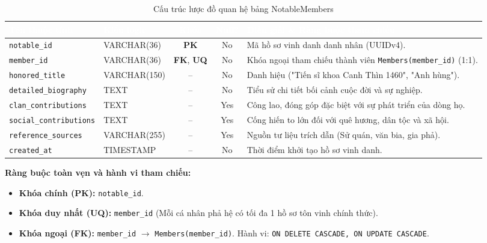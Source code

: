\begin{table}[H]
    \centering
    \small
    \renewcommand{\arraystretch}{1.2}
    \begin{tabularx}{\textwidth}{p{3.4cm} p{2.6cm} c c X}
        \toprule
        \rowcolor{tableheader}\textcolor{white}{\textbf{Tên thuộc tính}} & \textcolor{white}{\textbf{Kiểu logic}} & \textcolor{white}{\textbf{Khóa}} & \textcolor{white}{\textbf{Null?}} & \textcolor{white}{\textbf{Diễn giải \& Ràng buộc tham chiếu}} \\
        \midrule
        \rowcolor{tablerowalt}
        \texttt{notable\_id} & VARCHAR(36) & \textcolor{pkcolor}{\textbf{PK}} & No & Mã hồ sơ vinh danh danh nhân (UUIDv4). \\
        \texttt{member\_id} & VARCHAR(36) & \textcolor{fkcolor}{\textbf{FK}}, \textbf{UQ} & No & Khóa ngoại tham chiếu thành viên \texttt{Members(member\_id)} (1:1). \\
        \rowcolor{tablerowalt}
        \texttt{honored\_title} & VARCHAR(150) & -- & No & Danh hiệu ("Tiến sĩ khoa Canh Thìn 1460", "Anh hùng"). \\
        \texttt{detailed\_biography} & TEXT & -- & No & Tiểu sử chi tiết bối cảnh cuộc đời và sự nghiệp. \\
        \rowcolor{tablerowalt}
        \texttt{clan\_contributions} & TEXT & -- & Yes & Công lao, đóng góp đặc biệt với sự phát triển của dòng họ. \\
        \texttt{social\_contributions} & TEXT & -- & Yes & Cống hiến to lớn đối với quê hương, dân tộc và xã hội. \\
        \rowcolor{tablerowalt}
        \texttt{reference\_sources} & VARCHAR(255) & -- & Yes & Nguồn tư liệu trích dẫn (Sử quán, văn bia, gia phả). \\
        \texttt{created\_at} & TIMESTAMP & -- & No & Thời điểm khởi tạo hồ sơ vinh danh. \\
        \bottomrule
    \end{tabularx}
    \caption{Cấu trúc lược đồ quan hệ bảng NotableMembers}
    \label{tab:schema_notable_members}
\end{table}

\noindent\textbf{Ràng buộc toàn vẹn và hành vi tham chiếu:}
\begin{itemize}[noitemsep,topsep=2pt]
    \item \textbf{Khóa chính (PK):} \texttt{notable\_id}.
    \item \textbf{Khóa duy nhất (UQ):} \texttt{member\_id} (Mỗi cá nhân phả hệ có tối đa 1 hồ sơ tôn vinh chính thức).
    \item \textbf{Khóa ngoại (FK):} \texttt{member\_id} $\rightarrow$ \texttt{Members(member\_id)}. Hành vi: \texttt{ON DELETE CASCADE, ON UPDATE CASCADE}.
\end{itemize}


